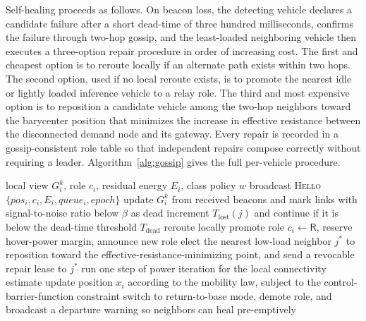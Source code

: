 \documentclass[drones,article,submit,moreauthors]{Definitions/mdpi}
\begin{document}
Self-healing proceeds as follows. On beacon loss, the detecting vehicle declares a candidate failure after a short dead-time of three hundred milliseconds, confirms the failure through two-hop gossip, and the least-loaded neighboring vehicle then executes a three-option repair procedure in order of increasing cost. The first and cheapest option is to reroute locally if an alternate path exists within two hops. The second option, used if no local reroute exists, is to promote the nearest idle or lightly loaded inference vehicle to a relay role. The third and most expensive option is to reposition a candidate vehicle among the two-hop neighbors toward the barycenter position that minimizes the increase in effective resistance between the disconnected demand node and its gateway. Every repair is recorded in a gossip-consistent role table so that independent repairs compose correctly without requiring a leader. Algorithm~\ref{alg:gossip} gives the full per-vehicle procedure.

\begin{algorithm}[H]
\caption{Gossip-Mesh (executed by each vehicle $i$ at every beacon slot)}
\label{alg:gossip}
\begin{algorithmic}[1]
\Require local view $G_i^k$, role $c_i$, residual energy $E_i$, class policy $w$
\State broadcast \textsc{Hello}$\{pos_i, c_i, E_i, queue_i, epoch\}$
\State update $G_i^k$ from received beacons and mark links with signal-to-noise ratio below $\beta$ as dead
    \State increment $T_{\mathrm{lost}}(j)$ and continue if it is below the dead-time threshold $T_{\mathrm{dead}}$
        \State reroute locally
        \State promote role $c_i \leftarrow \mathsf{R}$, reserve hover-power margin, announce new role
    \Else
        \State elect the nearest low-load neighbor $j^*$ to reposition toward the effective-resistance-minimizing point, and send a revocable repair lease to $j^*$
    \EndIf
\EndFor
\State run one step of power iteration for the local connectivity estimate
\State update position $x_i$ according to the mobility law, subject to the control-barrier-function constraint
    \State switch to return-to-base mode, demote role, and broadcast a departure warning so neighbors can heal pre-emptively
\EndIf
\end{algorithmic}
\end{algorithm}
\end{document}
